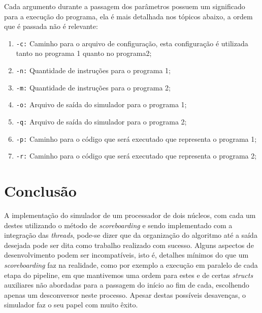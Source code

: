 \documentclass[journal]{IEEEtran}
\begin{document}
Cada argumento durante a passagem dos parâmetros possuem um significado para a execução do programa, ela é mais detalhada nos tópicos abaixo, a ordem que é passada não é relevante:
\begin{enumerate}
\item \texttt{-c:} Caminho para o arquivo de configuração, esta configuração é utilizada tanto no programa 1 quanto no programa2;
    \item \texttt{-n:} Quantidade de instruções para o programa 1;
    \item \texttt{-m:} Quantidade de instruções para o programa 2;
    \item \texttt{-o:} Arquivo de saída do simulador para o programa 1;
    \item \texttt{-q:} Arquivo de saída do simulador para o programa 2;
    \item \texttt{-p:} Caminho para o código que será executado que representa o programa 1;
    \item \texttt{-r:} Caminho para o código que será executado que representa o programa 2;
\end{enumerate}

\section{Conclusão}
A implementação do simulador de um processador de dois núcleos, com cada um destes utilizando o método de \textit{scoreboarding} e sendo implementado com a integração das \textit{threads}, pode-se dizer que da organização do algoritmo até a saída desejada pode ser dita como trabalho realizado com sucesso. Alguns aspectos de desenvolvimento podem ser incompatíveis, isto é, detalhes mínimos do que um \textit{scoreboarding} faz na realidade, como por exemplo a execução em paralelo de cada etapa do pipeline, em que mantivemos uma ordem para estes e de certas \textit{structs} auxiliares não abordadas para a passagem do início ao fim de cada, escolhendo apenas um desconversor neste processo. Apesar destas possíveis desavenças, o simulador faz o seu papel com muito êxito.
\end{document}
